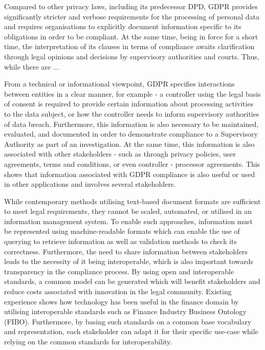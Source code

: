 Compared to other privacy laws, including its predecessor DPD, GDPR provides significantly stricter and verbose requirements for the processing of personal data and requires organisations to explicitly document information specific to its obligations in order to be compliant. At the same time, being in force for a short time, the interpretation of its clauses in terms of compliance awaits clarification through legal opinions and decisions by supervisory authorities and courts.
Thus, while there are ...

From a technical or informational viewpoint, GDPR specifies interactions between entities in a clear manner, for example - a controller using the legal basis of consent is required to provide certain information about processing activities to the data subject, or how the controller needs to inform supervisory authorities of data breach. Furthermore, this information is also necessary to be maintained, evaluated, and documented in order to demonstrate compliance to a Supervisory Authority as part of an investigation. At the same time, this information is also associated with other stakeholders - such as through privacy policies, user agreements, terms and conditions, or even controller - processor agreements. This shows that information associated with GDPR compliance is also useful or used in other applications and involves several stakeholders.


While contemporary methods utilising text-based document formats are sufficient to meet legal requirements, they cannot be scaled, automated, or utilised in an information management system. To enable such approaches, information must be represented using machine-readable formats which can enable the use of querying to retrieve information as well as validation methods to check its correctness. Furthermore, the need to share information between stakeholders leads to the necessity of it being interoperable, which is also important towards transparency in the compliance process. By using open and interoperable standards, a common model can be generated which will benefit stakeholders and reduce costs associated with innovation in the legal community. Existing experience shows how technology has been useful in the finance domain by utilising interoperable standards such as Finance Industry Business Ontology (FIBO). Furthermore, by basing such standards on a common base vocabulary and representation, each stakeholder can adapt it for their specific use-case while relying on the common standards for interoperability.

